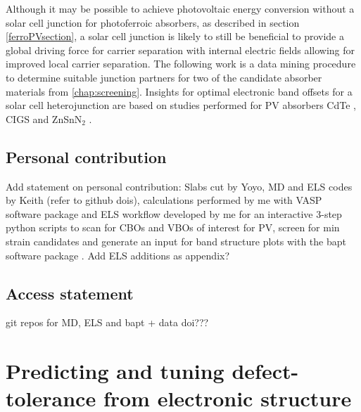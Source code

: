 \documentclass[11pt, twoside]{report}
\begin{document}
Although it may be possible to achieve photovoltaic energy conversion without a solar cell junction for photoferroic absorbers, as described in section \ref{ferroPVsection}, a solar cell junction is likely to still be beneficial to provide a global driving force for carrier separation with internal electric fields allowing for improved local carrier separation. The following work is a data mining procedure to determine suitable junction partners for two of the candidate absorber materials from \autoref{chap:screening}. Insights for optimal electronic band offsets for a solar cell heterojunction are based on studies performed for PV absorbers CdTe \cite{CdTe_spike}, CIGS \cite{p-type_spike} and ZnSnN$_2$ \cite{Elisabetta}.

\subsection{Personal contribution}
Add statement on personal contribution: Slabs cut by Yoyo, MD and ELS codes by Keith (refer to github dois), calculations performed by me with VASP software package \cite{VASP} and ELS workflow developed by me for an interactive 3-step python scripts to scan for CBOs and VBOs of interest for PV, screen for min strain candidates and generate an input for band structure plots with the bapt software package \cite{bapt}. Add ELS additions as appendix?
\subsection{Access statement}
git repos for MD, ELS and bapt + data doi???






\section{Predicting and tuning defect-tolerance from electronic structure}\label{sulfosalt_defects}
\end{document}
